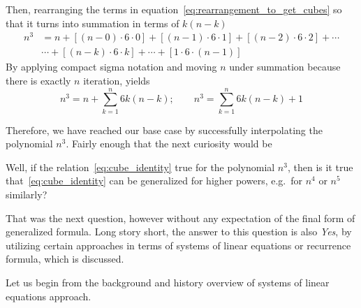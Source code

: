 Then, rearranging the terms in equation~\eqref{eq:rearrangement_to_get_cubes} so that it turns into summation
in terms of $k (n-k)$
\begin{equation*}
    \begin{split}
        n^3 &= n + [(n-0) \cdot 6 \cdot 0] + [(n-1)\cdot6\cdot1] + [(n-2)\cdot6\cdot2] + \cdots \\
        &\cdots + [(n-k)\cdot 6 \cdot k] + \cdots + [1\cdot6\cdot(n-1)]
    \end{split}
\end{equation*}
By applying compact sigma notation and moving $n$ under summation because there is exactly $n$ iteration, yields
\begin{equation}
    \label{eq:cube_identity}
    n^3 = n + \sum_{k=1}^{n} 6k(n-k); \quad \quad n^3 = \sum_{k=1}^{n} 6k(n-k) + 1
\end{equation}

Therefore, we have reached our base case by successfully interpolating the polynomial $n^3$.
Fairly enough that the next curiosity would be
\begin{question}
    Well, if the relation~\eqref{eq:cube_identity} true for the polynomial $n^3$,
    then is it true that~\eqref{eq:cube_identity} can be generalized for higher powers, e.g.\ for $n^4$ or $n^5$ similarly?
    \label{question:higher_powers}
\end{question}
That was the next question, however without any expectation of the final form of generalized formula.
Long story short, the answer to this question is also \textit{Yes}, by utilizing certain approaches
in terms of systems of linear equations or recurrence formula, which is discussed.

Let us begin from the background and history overview of systems of linear equations approach.
%
%
%
